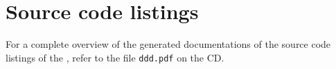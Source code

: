 \chapter{Source code listings}
\label{chap:sourceListings}


%

For a complete overview of the generated documentations of the source code listings of the \applicationname{}, refer to the file \texttt{ddd.pdf} on the \projectname{} CD.